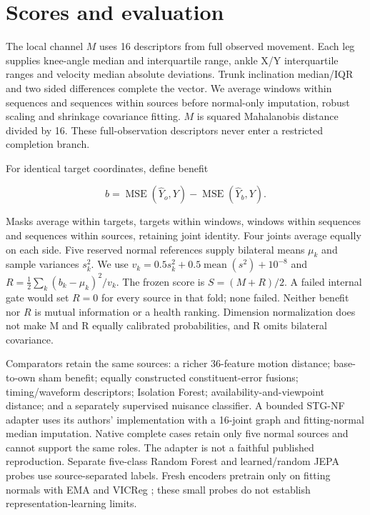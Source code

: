 \documentclass[letterpaper]{article}
\begin{document}
\section{Scores and evaluation}

The local channel \(M\) uses 16 descriptors from full observed movement. Each leg supplies knee-angle median and interquartile range, ankle X/Y interquartile ranges and velocity median absolute deviations. Trunk inclination median/IQR and two sided differences complete the vector. We average windows within sequences and sequences within sources before normal-only imputation, robust scaling and shrinkage covariance fitting. \(M\) is squared Mahalanobis distance divided by 16. These full-observation descriptors never enter a restricted completion branch.

For identical target coordinates, define benefit

\begin{equation}
b=\operatorname{MSE}(\widehat Y_o,Y)-\operatorname{MSE}(\widehat Y_b,Y).
\end{equation}

Masks average within targets, targets within windows, windows within sequences and sequences within sources, retaining joint identity. Four joints average equally on each side. Five reserved normal references supply bilateral means \(\mu_k\) and sample variances \(s_k^2\). We use \(v_k=0.5s_k^2+0.5\operatorname{mean}(s^2)+10^{-8}\) and \(R=\frac12\sum_k(b_k-\mu_k)^2/v_k\). The frozen score is \(S=(M+R)/2\). A failed internal gate would set \(R=0\) for every source in that fold; none failed. Neither benefit nor \(R\) is mutual information or a health ranking. Dimension normalization does not make M and R equally calibrated probabilities, and R omits bilateral covariance.

Comparators retain the same sources: a richer 36-feature motion distance; base-to-own sham benefit; equally constructed constituent-error fusions; timing/waveform descriptors; Isolation Forest; availability-and-viewpoint distance; and a separately supervised nuisance classifier. A bounded STG-NF adapter uses its authors' implementation with a 16-joint graph and fitting-normal median imputation. Native complete cases retain only five normal sources and cannot support the same roles. The adapter is not a faithful published reproduction. Separate five-class Random Forest and learned/random JEPA probes use source-separated labels. Fresh encoders pretrain only on fitting normals with EMA and VICReg \citep{bardes2022vicreg}; these small probes do not establish representation-learning limits.
\end{document}

